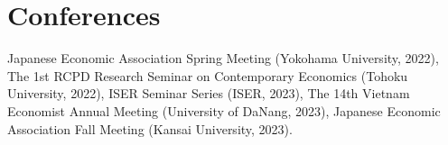 \newcommand{\playsymbol}{$\blacktriangleright$}

\section{\sc Conferences}
Japanese Economic Association Spring Meeting (Yokohama University, 2022), 
The 1st RCPD Research Seminar on Contemporary Economics (Tohoku University, 2022), 
ISER Seminar Series (ISER, 2023),
The 14th Vietnam Economist Annual Meeting (University of DaNang, 2023),
Japanese Economic Association Fall Meeting (Kansai University, 2023).


